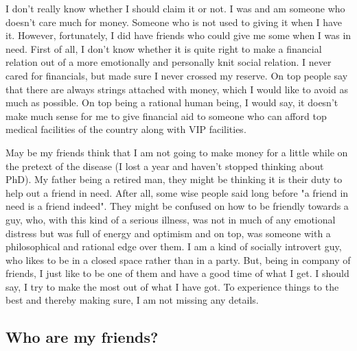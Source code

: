 {I don't really know whether I should claim it or not. I was and am someone who doesn't care much 
for money. Someone who is not used to giving it when I have it. However, fortunately, I did have friends who could give me 
some when I was in need. First of all, I don't know whether it is quite right to make a financial 
relation out of a more emotionally and personally knit social relation. I never cared for financials, 
but made sure I never crossed my reserve. On top people say that there are always strings attached with 
money, which I would like to avoid as much as possible. On top being a rational human being, I would 
say, it doesn't make much sense for me to give financial aid to someone who can afford top medical facilities of the country along with VIP facilities. 

May be my friends think that I am not going to make money for a little while on the pretext of 
the disease (I lost a year and haven't stopped thinking about PhD). My father being a retired man, 
they might be thinking it is their duty to help out a friend in need. After all, some wise people said 
long before "a friend in need is a friend indeed". They might be confused on how to be friendly 
towards a guy, who, with this kind of a serious illness, was not in much of any emotional distress but was full of energy 
and optimism and on top, was someone with a philosophical and rational edge over them. I am a kind of socially
introvert guy, who likes to be in a closed space rather than in a party. But, being in company of friends, 
I just like to be one of them and have a good time of what I get. I should say, I try to make the
most out of what I have got. To experience things to the best and thereby making sure, I am not missing any details. 

\subsection*{Who are my friends?}

}
